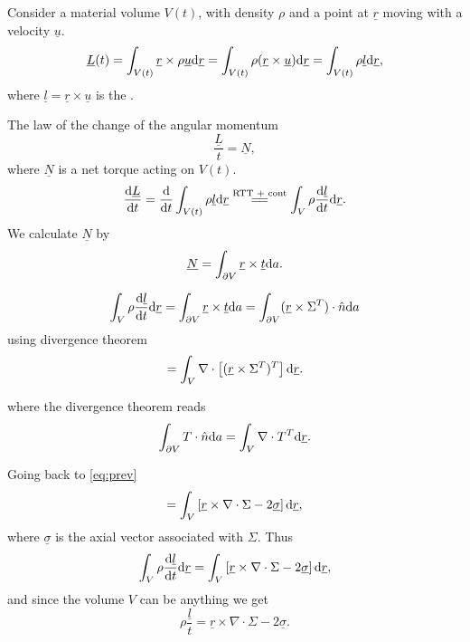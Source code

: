\documentclass[11pt,oneside]{book}
\renewcommand{\vec}[1]{\underline{#1}}
\theoremstyle{definition} %
\theoremstyle{plain} %
\theoremstyle{remark} %
\theoremstyle{underline}
\begin{document}
  Consider a material volume $V(t)$, with density $\rho$ and a point at $\vec r$ moving with a velocity $\vec u$.
  \begin{displaymath}
    \vec L (t) = \int_{V(t)}\vec r \times \rho \vec u \d \vec r
    = \int_{V(t)} \rho (\vec r \times \vec u) \d \vec r
    = \int_{V(t)} \rho \vec l \d \vec r,
  \end{displaymath}
  where $\vec l = \vec r \times \vec u $ is the .

  The law of the change of the angular momentum
  \begin{displaymath}
    \dfrac{ \vec L }{t} = \vec N,
  \end{displaymath}
  where $\vec N$ is a net torque acting on $V(t)$.
  \begin{displaymath}
    \dfrac{\vec L}{t} = \dfrac{}{t} \int_{V(t)} \rho \vec l \d \vec r \os{\tm{RTT + cont}}{=\joinrel=} \int_V \rho \dfrac{\vec l}{t} \d \vec r.
  \end{displaymath}
  We calculate $\vec N$ by
  \begin{displaymath}
    \vec N = \int_{\partial V} \vec r \times\vec t \d a.
  \end{displaymath}

  \begin{displaymath}
    \int_V \rho \dfrac{\vec l}{t} \d \vec r = \int_{\partial V} \vec r \times \vec t \d a 
    = \int_{\partial V} (\vec r \times \Sigma^T) \cdot \hat n \d a 
  \end{displaymath}
  using divergence theorem
  \begin{equation}
    = \int_V \nabla \cdot \left[ ( \vec r \times \Sigma^T)^T \right] \d \vec r.
    \label{eq:prev}
  \end{equation}

  where the divergence theorem reads
  \begin{displaymath}
    \int_{\partial V} T \cdot \hat n \d a = \int_V \nabla \cdot T^T  \d \vec r.
  \end{displaymath}

  Going back to \ref{eq:prev}
  \begin{displaymath}
     = \int_V \left[ \vec r \times \nabla \cdot \Sigma - 2 \vec \sigma \right] \d \vec r,
  \end{displaymath}
  where $\vec \sigma $ is the axial vector associated with $\Sigma$.
  Thus
  \begin{displaymath}
    \int_V \rho \dfrac{ \vec l}{t} \d \vec r = \int_V \left[ \vec r \times \nabla \cdot \Sigma - 2 \vec \sigma \right] \d \vec r ,
  \end{displaymath}
  and since the volume $V$ can be anything we get
  \begin{equation}
    \rho \dfrac{ \vec l }{t} = \vec r \times \nabla \cdot \Sigma - 2 \vec \sigma.
    \label{eq:2.2}
  \end{equation}
\end{document}
